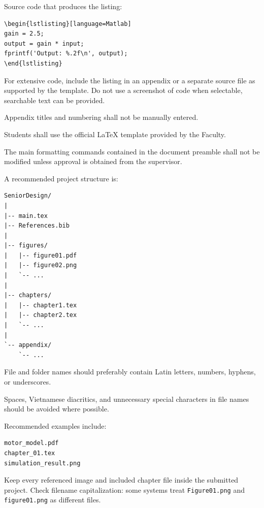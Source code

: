 {Source code that produces the listing:

\begin{verbatim}
\begin{lstlisting}[language=Matlab]
gain = 2.5;
output = gain * input;
fprintf('Output: %.2f\n', output);
\end{lstlisting}
\end{verbatim}

For extensive code, include the listing in an appendix or a separate
source file as supported by the template. Do not use a screenshot of
code when selectable, searchable text can be provided.

Appendix titles and numbering shall not be manually entered.

\vspace{0.3cm}



Students shall use the official \LaTeX{} template provided by the
Faculty.

The main formatting commands contained in the document preamble
shall not be modified unless approval is obtained from the
supervisor.

A recommended project structure is:

\begin{verbatim}
SeniorDesign/
|
|-- main.tex
|-- References.bib
|
|-- figures/
|   |-- figure01.pdf
|   |-- figure02.png
|   `-- ...
|
|-- chapters/
|   |-- chapter1.tex
|   |-- chapter2.tex
|   `-- ...
|
`-- appendix/
    `-- ...
\end{verbatim}

File and folder names should preferably contain Latin letters,
numbers, hyphens, or underscores.

Spaces, Vietnamese diacritics, and unnecessary special characters
in file names should be avoided where possible.

Recommended examples include:

\begin{verbatim}
motor_model.pdf
chapter_01.tex
simulation_result.png
\end{verbatim}

Keep every referenced image and included chapter file inside the
submitted project. Check filename capitalization: some systems treat
\verb|Figure01.png| and \verb|figure01.png| as different files.

}
